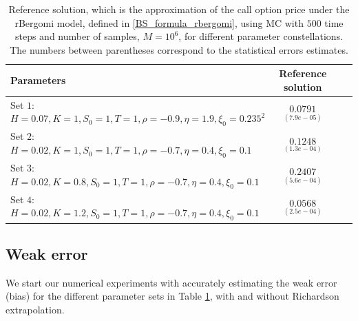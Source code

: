 \FloatBarrier
\begin{table}[!h]
	\centering
	\begin{small}
	\begin{tabular}{l*{2}{c}r}
	\toprule[1.5pt]
		Parameters            & Reference solution    \\
		\hline

			Set $1$:	$H=0.07, K=1,S_0=1, T=1, \rho=-0.9, \eta=1.9,\xi_0=0.235^2$   & $\underset{(7.9e-05)}{0.0791}$  \\	

				Set $2$:	$H=0.02, K=1, S_0=1, T=1,\rho=-0.7, \eta=0.4,\xi_0=0.1$   & $\underset{(1.3e-04)}{0.1248}$  \\
					Set $3$:	$H=0.02, K=0.8,S_0=1,T=1, \rho=-0.7, \eta=0.4,\xi_0=0.1$   & $\underset{(5.6e-04)}{0.2407}$  \\
						Set $4$:	$H=0.02, K=1.2,S_0=1,T=1, \rho=-0.7, \eta=0.4,\xi_0=0.1$   & $\underset{(2.5e-04)}{0.0568}$  \\
	\bottomrule[1.25pt]
	\end{tabular}
\end{small}
	\caption{Reference solution, which is the  approximation of the call option price under the rBergomi model, defined in \eqref{BS_formula_rbergomi},  using MC with $500$ time steps and number of samples, $M=10^6$, for different parameter constellations.  The numbers between parentheses correspond to the statistical errors estimates.}
	\label{table:Reference solution, using MC with $500$ time steps, of Call option price under rBergomi model, for different parameter constellation.}
\end{table}
\FloatBarrier

\subsection{Weak error} \label{sec:Weak error plots_no_change}

We start our numerical experiments with accurately  estimating the weak error (bias)  for the different parameter sets  in Table \ref{table:Reference solution, using MC with $500$ time steps, of Call option price under rBergomi model, for different parameter constellation.}, with and without Richardson extrapolation.  

